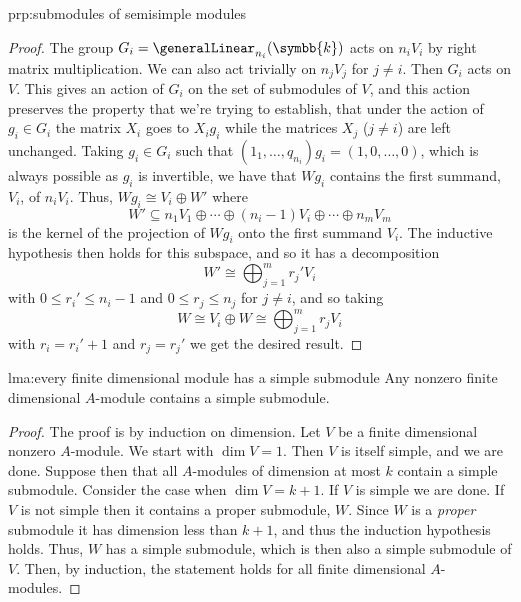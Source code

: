 \documentclass[fleqn]{NotesClass}
\renewcommand{\field}{\symbb{k}}
\newcommand{\isomorphic}{\cong}
\begin{document}
\begin{prp}{}{prp:submodules of semisimple modules}
\begin{proof}
            The group \(G_i = \generalLinear_{n_i}(\field)\) acts on \(n_i V_i\) by right matrix multiplication.
            We can also act trivially on \(n_j V_j\) for \(j \ne i\).
            Then \(G_i\) acts on \(V\).
            This gives an action of \(G_i\) on the set of submodules of \(V\), and this action preserves the property that we're trying to establish, that under the action of \(g_i \in G_i\) the matrix \(X_i\) goes to \(X_i g_i\) while the matrices \(X_j\) (\(j \ne i\)) are left unchanged.
            Taking \(g_i \in G_i\) such that \((1_1, \dotsc, q_{n_i})g_i = (1, 0, \dotsc, 0)\), which is always possible as \(g_i\) is invertible, we have that \(Wg_i\) contains the first summand, \(V_i\), of \(n_i V_i\).
            Thus, \(Wg_i \isomorphic V_i \oplus W'\) where 
            \begin{equation}
                W' \subseteq n_1 V_1 \oplus \dotsb \oplus (n_i - 1)V_i \oplus \dotsb \oplus n_m V_m
            \end{equation}
            is the kernel of the projection of \(Wg_i\) onto the first summand \(V_i\).
            The inductive hypothesis then holds for this subspace, and so it has a decomposition
            \begin{equation}
                W' \isomorphic \bigoplus_{j=1}^m r_j' V_i
            \end{equation}
            with \(0 \le r_i' \le n_i - 1\) and \(0 \le r_j \le n_j\) for \(j \ne i\), and so taking
            \begin{equation}
                W \isomorphic V_i \oplus W \isomorphic \bigoplus_{j=1}^m r_jV_i
            \end{equation}
            with \(r_i = r_i' + 1\) and \(r_j = r_j'\) we get the desired result.
        \end{proof}
    \end{prp}
    
    \begin{lma}{}{lma:every finite dimensional module has a simple submodule}
        Any nonzero finite dimensional \(A\)-module contains a simple submodule.
        \begin{proof}
            The proof is by induction on dimension.
            Let \(V\) be a finite dimensional nonzero \(A\)-module.
            We start with \(\dim V = 1\).
            Then \(V\) is itself simple, and we are done.
            Suppose then that all \(A\)-modules of dimension at most \(k\) contain a simple submodule.
            Consider the case when \(\dim V = k + 1\).
            If \(V\) is simple we are done.
            If \(V\) is not simple then it contains a proper submodule, \(W\).
            Since \(W\) is a \emph{proper} submodule it has dimension less than \(k + 1\), and thus the induction hypothesis holds.
            Thus, \(W\) has a simple submodule, which is then also a simple submodule of \(V\).
            Then, by induction, the statement holds for all finite dimensional \(A\)-modules.
        \end{proof}
    \end{lma}
    
\end{document}
